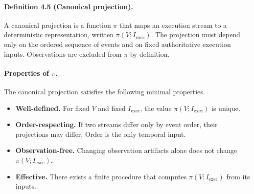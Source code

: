 \paragraph{Definition 4.5 (Canonical projection).}
A canonical projection is a function $\pi$ that maps an execution stream to a deterministic representation, written $\pi(V; I_{\text{exec}})$. The projection must depend only on the ordered sequence of events and on fixed authoritative execution inputs. Observations are excluded from $\pi$ by definition.

\paragraph{Properties of $\pi$.}
The canonical projection satisfies the following minimal properties.
\begin{itemize}
  \item \textbf{Well-defined.} For fixed $V$ and fixed $I_{\text{exec}}$, the value $\pi(V; I_{\text{exec}})$ is unique.
  \item \textbf{Order-respecting.} If two streams differ only by event order, their projections may differ. Order is the only temporal input.
  \item \textbf{Observation-free.} Changing observation artifacts alone does not change $\pi(V; I_{\text{exec}})$.
  \item \textbf{Effective.} There exists a finite procedure that computes $\pi(V; I_{\text{exec}})$ from its inputs.
\end{itemize}
